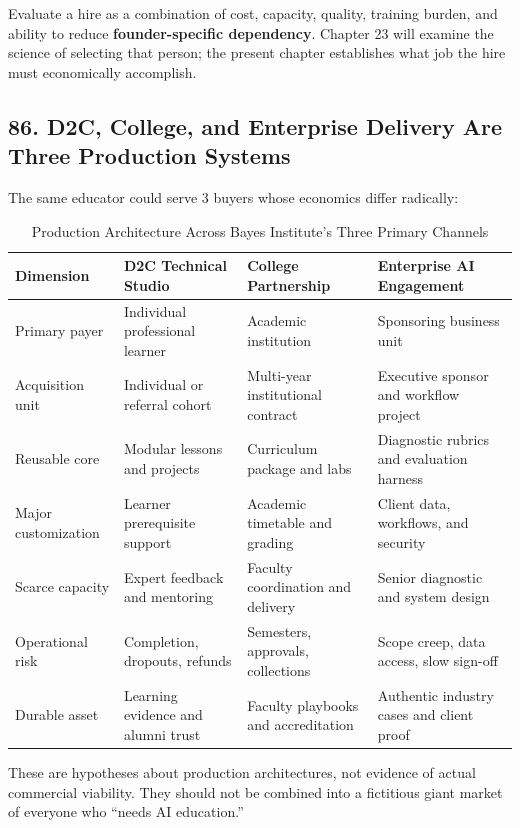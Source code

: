 Evaluate a hire as a combination of cost, capacity, quality, training burden, and ability to reduce \textbf{founder-specific dependency}. Chapter 23 will examine the science of selecting that person; the present chapter establishes what job the hire must economically accomplish.

\subsection*{86. D2C, College, and Enterprise Delivery Are Three Production Systems}

The same educator could serve 3 buyers whose economics differ radically:

\begin{table}[t]
\centering
\small
\caption{Production Architecture Across Bayes Institute's Three Primary Channels}
\begin{tabularx}{\textwidth}{p{}p{}p{}X}
\toprule
\textbf{Dimension} & \textbf{D2C Technical Studio} & \textbf{College Partnership} & \textbf{Enterprise AI Engagement} \\
\midrule
Primary payer & Individual professional learner & Academic institution & Sponsoring business unit \\
Acquisition unit & Individual or referral cohort & Multi-year institutional contract & Executive sponsor and workflow project \\
Reusable core & Modular lessons and projects & Curriculum package and labs & Diagnostic rubrics and evaluation harness \\
Major customization & Learner prerequisite support & Academic timetable and grading & Client data, workflows, and security \\
Scarce capacity & Expert feedback and mentoring & Faculty coordination and delivery & Senior diagnostic and system design \\
Operational risk & Completion, dropouts, refunds & Semesters, approvals, collections & Scope creep, data access, slow sign-off \\
Durable asset & Learning evidence and alumni trust & Faculty playbooks and accreditation & Authentic industry cases and client proof \\
\bottomrule
\end{tabularx}
\end{table}

These are hypotheses about production architectures, not evidence of actual commercial viability. They should not be combined into a fictitious giant market of everyone who ``needs AI education.''

